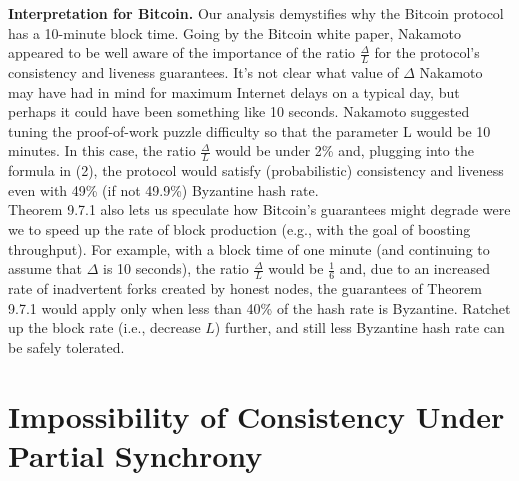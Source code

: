 \noindent
\textbf{Interpretation for Bitcoin.} Our analysis demystifies why the Bitcoin protocol has a
10-minute block time. Going by the Bitcoin white paper, Nakamoto appeared to be
well aware of the importance of the ratio $\frac{\Delta}{L}$ for the protocol’s consistency and liveness
guarantees. It’s not clear what value of $\Delta$ Nakamoto may have had in mind for maximum
Internet delays on a typical day, but perhaps it could have been something like 10 seconds.
Nakamoto suggested tuning the proof-of-work puzzle difficulty so that the parameter L would
be 10 minutes. In this case, the ratio $\frac{\Delta}{L}$ would be under 2\% and, plugging into the formula
in (2), the protocol would satisfy (probabilistic) consistency and liveness even with 49\% (if
not 49.9\%) Byzantine hash rate.\\

Theorem 9.7.1 also lets us speculate how Bitcoin’s guarantees might degrade were we to
speed up the rate of block production (e.g., with the goal of boosting throughput). For
example, with a block time of one minute (and continuing to assume that $\Delta$ is 10 seconds),
the ratio $\frac{\Delta}{L}$ would be $\frac{1}{6}$ and, due to an increased rate of inadvertent forks created by
honest nodes, the guarantees of Theorem 9.7.1 would apply only when less than 40\% of the
hash rate is Byzantine. Ratchet up the block rate (i.e., decrease $L$) further, and still less
Byzantine hash rate can be safely tolerated.

\section{Impossibility of Consistency Under Partial Synchrony}
